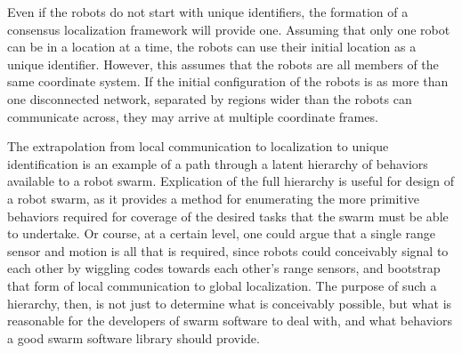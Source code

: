 \documentclass[]{article}
\begin{document}
Even if the robots do not start with unique identifiers, the formation of a consensus localization framework will provide one.
Assuming that only one robot can be in a location at a time, the robots can use their initial location as a unique identifier. 
However, this assumes that the robots are all members of the same coordinate system.
If the initial configuration of the robots is as more than one disconnected network, separated by regions wider than the robots can communicate across, they may arrive at multiple coordinate frames.


The extrapolation from local communication to localization to unique identification is an example of a path through a latent hierarchy of behaviors available to a robot swarm. 
Explication of the full hierarchy is useful for design of a robot swarm, as it provides a method for enumerating the more primitive behaviors required for coverage of the desired tasks that the swarm must be able to undertake. 
Or course, at a certain level, one could argue that a single range sensor and motion is all that is required, since robots could conceivably signal to each other by wiggling codes towards each other's range sensors, and bootstrap that form of local communication to global localization. 
The purpose of such a hierarchy, then, is not just to determine what is conceivably possible, but what is reasonable for the developers of swarm software to deal with, and what behaviors a good swarm software library should provide. 

\end{document}

